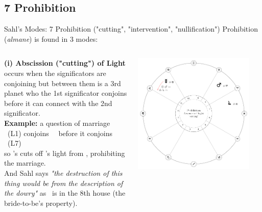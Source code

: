 \subsection{7 Prohibition}
\begin{frame}[t]{Sahl's Modes: 7 Prohibition ("cutting", "intervention", "nullification")}
Prohibition (\textsl{almane}) is found in 3 modes:\footnotemark[1]  \\
\begin{columns}[T, onlytextwidth]
\vspace{0.25cm}
\textbf{(i) Abscission ("cutting") of Light} \\
occurs when the significators are conjoining but between them is a 3rd planet who the 1st significator conjoins before it can connect with the 2nd significator. \\

\vspace{0.25cm}
\textbf{Example:} a question of marriage \\
\ul
\Mercury\ (L1) conjoins \Square\ \Mars\ before it conjoins \Trine\ \Jupiter (L7) \\
so \Mars's cuts off \Mercury's light from \Jupiter, prohibiting the marriage. \\

\vspace{0.15cm}
And Sahl says \textsl{"the destruction of this thing would be from the description of the dowry"} as \Mars\ is in the 8th house (the bride-to-be's property).

	
\vspace{-0.5cm}
\begin{center}
{\includegraphics[width=0.9\textwidth]{charts/62-abscission}} \\
\end{center}
\end{columns}
\end{frame}

